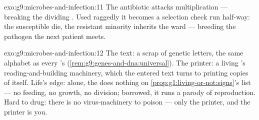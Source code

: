 \begin{solution}{exo:g9:microbes-and-infection:11}
The antibiotic attacks multiplication --- breaking the
dividing . Used raggedly it becomes a selection
check run half-way: the susceptible die, the resistant
minority inherits the ward --- breeding the pathogen the
next patient meets.
\end{solution}

\begin{solution}{exo:g9:microbes-and-infection:12}
The text: a scrap of genetic letters, the same alphabet as
every 's (\cref{rem:g9:genes-and-dna:universal}). The
printer: a living 's reading-and-building machinery,
which the entered text turns to printing copies of
itself. Life's edge: alone, the  does nothing on
\cref{prop:g1:living-or-not:signs}'s list --- no feeding,
no growth, no division; borrowed, it runs a parody of
reproduction. Hard to drug: there is no virus-machinery
to poison --- only the printer, and the printer is you.
\end{solution}

